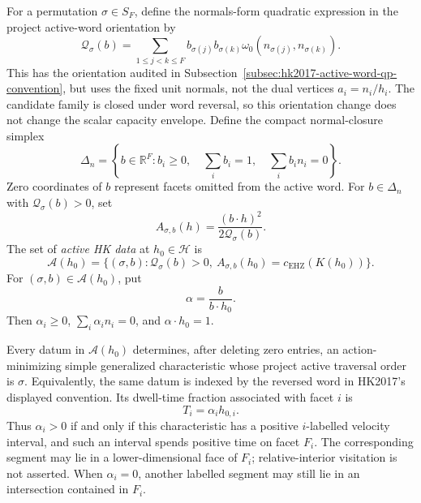 \begin{unverified}
For a permutation $\sigma\in S_F$, define the normals-form quadratic
expression in the project active-word orientation by
\[
  \mathcal Q_\sigma(b)=
  \sum_{1\leq j<k\leq F}b_{\sigma(j)}b_{\sigma(k)}
  \omega_0(n_{\sigma(j)},n_{\sigma(k)}).
\]
This has the orientation audited in
Subsection~\ref{subsec:hk2017-active-word-qp-convention}, but uses the fixed
unit normals, not the dual vertices $a_i=n_i/h_i$.  The candidate family is
closed under word reversal, so this orientation change does not change the
scalar capacity envelope.  Define the compact
normal-closure simplex
\[
  \Delta_n=
  \left\{b\in\mathbb R^F:
    b_i\geq0,\quad \sum_i b_i=1,\quad \sum_i b_i n_i=0
  \right\}.
\]
Zero coordinates of $b$ represent facets omitted from the active word.  For
$b\in\Delta_n$ with $\mathcal Q_\sigma(b)>0$, set
\begin{equation}\label{eq:facet-coverage-action-branch}
  A_{\sigma,b}(h)=\frac{(b\cdot h)^2}{2\mathcal Q_\sigma(b)}.
\end{equation}
The set of \emph{active HK data} at $h_0\in\mathcal H$ is
\begin{equation}\label{eq:facet-coverage-active-data}
  \mathcal A(h_0)=
  \{(\sigma,b):\mathcal Q_\sigma(b)>0,
      \ A_{\sigma,b}(h_0)=c_{\mathrm{EHZ}}(K(h_0))\}.
\end{equation}
For $(\sigma,b)\in\mathcal A(h_0)$, put
\begin{equation}\label{eq:facet-coverage-normalized-weight}
  \alpha=\frac{b}{b\cdot h_0}.
\end{equation}
Then $\alpha_i\geq0$, $\sum_i\alpha_i n_i=0$, and
$\alpha\cdot h_0=1$.

\begin{lemma}
\label{lem:facet-coverage-orbit-realization}
Every datum in $\mathcal A(h_0)$ determines, after deleting zero entries, an
action-minimizing simple generalized characteristic whose project active
traversal order is $\sigma$.  Equivalently, the same datum is indexed by the
reversed word in HK2017's displayed convention.  Its dwell-time fraction
associated with facet $i$ is
\begin{equation}\label{eq:facet-coverage-dwell-fraction}
  T_i=\alpha_i h_{0,i}.
\end{equation}
Thus $\alpha_i>0$ if and only if this characteristic has a positive
$i$-labelled velocity interval, and such an interval spends positive time on
facet $F_i$.  The corresponding segment may lie in a lower-dimensional face
of $F_i$; relative-interior visitation is not asserted.  When $\alpha_i=0$,
another labelled segment may still lie in an intersection contained in $F_i$.
\end{lemma}


\end{unverified}
